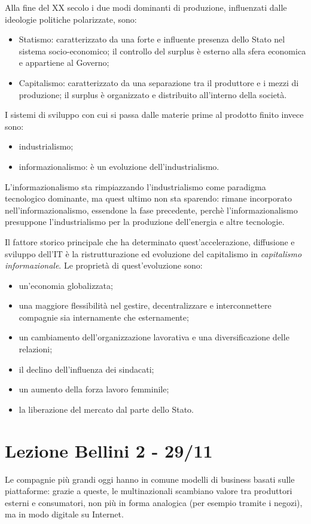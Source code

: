 \documentclass[a4page, 11pt]{article}
\begin{document}
Alla fine del XX secolo i due modi dominanti di produzione, influenzati dalle ideologie politiche polarizzate, sono:
\begin{itemize}
  \item Statismo: caratterizzato da una forte e influente presenza dello Stato nel sistema socio-economico; il controllo del surplus è esterno alla sfera economica e appartiene al Governo;
  \item Capitalismo: caratterizzato da una separazione tra il produttore e i mezzi di produzione; il surplus è organizzato e distribuito all'interno della società.
\end{itemize}
I sistemi di sviluppo con cui si passa dalle materie prime al prodotto finito invece sono:
\begin{itemize}
  \item industrialismo;
  \item informazionalismo: è un evoluzione dell'industrialismo.
\end{itemize}
L'informazionalismo sta rimpiazzando l'industrialismo come paradigma tecnologico dominante, ma quest ultimo non sta sparendo: rimane incorporato nell'informazionalismo, essendone la fase precedente, perchè l'informazionalismo presuppone l'industrialismo per la produzione dell'energia e altre tecnologie.

Il fattore storico principale che ha determinato quest'accelerazione, diffusione e sviluppo dell'IT è la ristrutturazione ed evoluzione del capitalismo in \textit{capitalismo informazionale}.
Le proprietà di quest'evoluzione sono:
\begin{itemize}
  \item un'economia globalizzata;
  \item una maggiore flessibilità nel gestire, decentralizzare e interconnettere compagnie sia internamente che esternamente;
  \item un cambiamento dell'organizzazione lavorativa e una diversificazione delle relazioni;
  \item il declino dell'influenza dei sindacati;
  \item un aumento della forza lavoro femminile;
  \item la liberazione del mercato dal parte dello Stato.
\end{itemize}
  

\section*{Lezione Bellini 2 - 29/11}
Le compagnie più grandi oggi hanno in comune modelli di business basati sulle piattaforme: grazie a queste, le multinazionali scambiano valore tra produttori esterni e consumatori, non più in forma analogica (per esempio tramite i negozi), ma in modo digitale su Internet.
\end{document}
